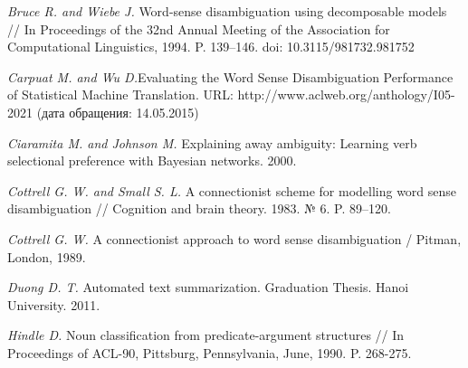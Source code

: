 \documentclass{article}
\begin{document}
\begin{articletext}
\begin{thebibliography}{9}
\textit{Bruce R. and  Wiebe J. }Word-sense disambiguation using decomposable models // In Proceedings of the 32nd Annual Meeting of the Association for Computational Linguistics, 1994. P. 139–146. doi: 10.3115/981732.981752

\textit{Carpuat M. and Wu D.}Evaluating the Word Sense Disambiguation Performance of Statistical Machine Translation. URL: http://www.aclweb.org/anthology/I05-2021 (дата обращения: 14.05.2015)

\textit{Ciaramita M. and  Johnson M. }Explaining away ambiguity: Learning verb selectional preference with Bayesian networks. 2000. 

\textit{Cottrell G. W. and  Small S. L. }A connectionist  scheme for modelling word  sense  disambiguation // Cognition and brain theory. 1983. № 6. P. 89–120. 

\textit{Cottrell G. W. }A connectionist approach to word sense disambiguation / Pitman, London, 1989.

\textit{Duong D. T. }Automated text summarization. Graduation Thesis. Hanoi University. 2011. 

\textit{Hindle D. }Noun classification from predicate-argument structures // In Proceedings of ACL-90, Pittsburg, Pennsylvania, June, 1990. P. 268-275.






\end{thebibliography}
\end{articletext}
\end{document}
